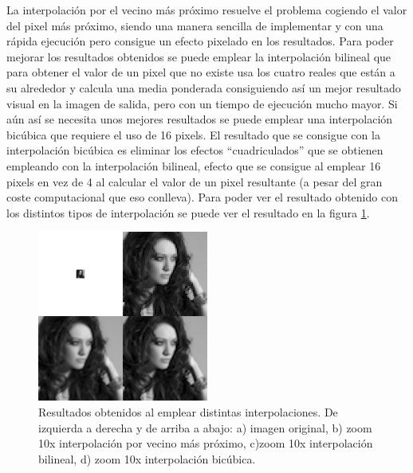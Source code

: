 \documentclass{article}
\begin{document}
	La interpolación por el vecino más próximo resuelve el problema cogiendo el valor del pixel más próximo, siendo una manera sencilla de implementar y con una rápida ejecución pero consigue un efecto pixelado en los resultados. Para poder mejorar los resultados obtenidos se puede emplear la interpolación bilineal que para obtener el valor de un pixel que no existe usa los cuatro reales que están a su alrededor y calcula una media ponderada consiguiendo así un mejor resultado visual en la imagen de salida, pero con un tiempo de ejecución mucho mayor. Si aún así se necesita unos mejores resultados se puede emplear una interpolación bicúbica que requiere el uso de 16 pixels. El resultado que se consigue con la interpolación bicúbica es eliminar los efectos ``cuadriculados'' que se obtienen empleando con la interpolación bilineal, efecto que se consigue al emplear 16 pixels en vez de 4 al calcular el valor de un pixel resultante (a pesar del gran coste computacional que eso conlleva). Para poder ver el resultado obtenido con los distintos tipos de interpolación se puede ver el resultado en la figura \ref{fig:interpolationExample}.

\begin{figure}[h]
  \centering
    \includegraphics[width=0.5\textwidth]{img/example.png}
  \caption{Resultados obtenidos al emplear distintas interpolaciones. De izquierda a derecha y de arriba a abajo:
  a) imagen original, b) zoom 10x interpolación por vecino más próximo, c)zoom 10x interpolación bilineal, d) zoom 10x interpolación bicúbica.}
  \label{fig:interpolationExample}
\end{figure}
\end{document}
